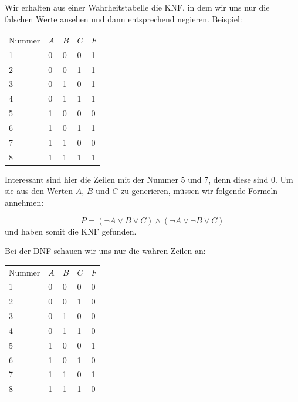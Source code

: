\documentclass{scrartcl}
\begin{document}
Wir erhalten aus einer Wahrheitstabelle die KNF, in dem wir uns nur die falschen Werte ansehen und dann entsprechend negieren.
Beispiel:

\begin{table}[h!]
\begin{tabular}{l|l|l|l|l|}
\cline{2-5}
Nummer & $A$ & $B$ & $C$ & $F$ \\ \cline{2-5}
1      & 0 & 0 & 0 & 1 \\ \cline{2-5}
2      & 0 & 0 & 1 & 1 \\ \cline{2-5}
3      & 0 & 1 & 0 & 1 \\ \cline{2-5}
4      & 0 & 1 & 1 & 1 \\ \cline{2-5}
5      & 1 & 0 & 0 & 0 \\ \cline{2-5}
6      & 1 & 0 & 1 & 1 \\ \cline{2-5}
7      & 1 & 1 & 0 & 0 \\ \cline{2-5}
8      & 1 & 1 & 1 & 1 \\ \cline{2-5}
\end{tabular}
\end{table}

Interessant sind hier die Zeilen mit der Nummer 5 und 7, denn diese sind 0. Um sie aus den Werten $A$, $B$ und $C$ zu generieren,
müssen wir folgende Formeln annehmen:

\begin{equation}
	P = (\lnot A \lor B \lor C) \wedge (\lnot A \lor \lnot B \lor C)
\end{equation}
und haben somit die KNF gefunden.

Bei der DNF schauen wir uns nur die wahren Zeilen an:

\begin{table}[h!]
\begin{tabular}{l|l|l|l|l|}
\cline{2-5}
Nummer & $A$ & $B$ & $C$ & $F$ \\ \cline{2-5}
1      & 0 & 0 & 0 & 0 \\ \cline{2-5}
2      & 0 & 0 & 1 & 0 \\ \cline{2-5}
3      & 0 & 1 & 0 & 0 \\ \cline{2-5}
4      & 0 & 1 & 1 & 0 \\ \cline{2-5}
5      & 1 & 0 & 0 & 1 \\ \cline{2-5}
6      & 1 & 0 & 1 & 0 \\ \cline{2-5}
7      & 1 & 1 & 0 & 1 \\ \cline{2-5}
8      & 1 & 1 & 1 & 0 \\ \cline{2-5}
\end{tabular}
\end{table}
\end{document}
